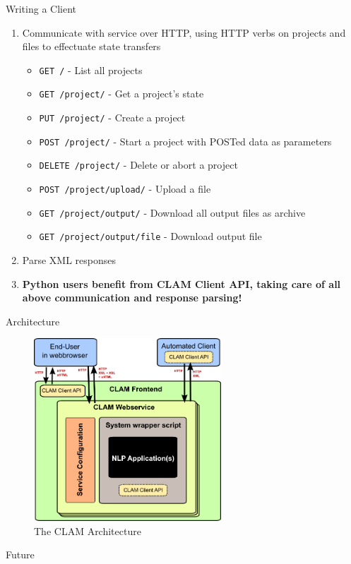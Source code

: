 \documentclass[compress]{beamer}
\begin{document}
\begin{frame}
    \begin{block}{Writing a Client}
        \begin{enumerate}
            \item Communicate with service over HTTP, using HTTP verbs on projects and files to effectuate state transfers 
            \begin{itemize}
                \item \texttt{GET /} - List all projects
                \item \texttt{GET /project/} - Get a project's state
                \item \texttt{PUT /project/} - Create a project
                \item \texttt{POST /project/} - Start a project with POSTed data as parameters
                \item \texttt{DELETE /project/} - Delete or abort a project
                \item \texttt{POST /project/upload/} - Upload a file
                \item \texttt{GET /project/output/} - Download all output files as archive
                \item \texttt{GET /project/output/file} - Download output file
            \end{itemize}
            \item Parse XML responses
            \item \textbf{Python users benefit from CLAM Client API, taking care of all above communication and response parsing!}
        \end{enumerate}
    \end{block}

\end{frame}

\begin{frame}
    \begin{block}{Architecture}
        \begin{figure}[h]
        \begin{center}
        \includegraphics[width=70.0mm]{architecture.png}
        \end{center}
        \caption{The CLAM Architecture}
        \label{fig:arch} 
        \end{figure}

    \end{block}
\end{frame}

\begin{frame}
    \begin{block}{Future}
    \end{block}
\end{frame}
\end{document}

